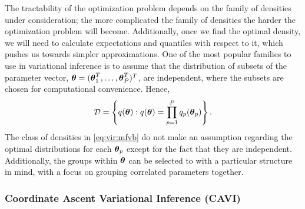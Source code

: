 \documentclass[]{article}
\newcommand{\V}[1]{{\bm{\mathbf{\MakeLowercase{#1}}}}} %
\def \vtheta{{\V{\theta}}}
\begin{document}
The tractability of the optimization problem depends on the family of densities
under consideration; the more complicated the family of densities the harder the
optimization problem will become. Additionally, once we find the optimal
density, we will need to calculate expectations and quantiles with respect to
it, which pushes us towards simpler approximations. One of the most popular
families to use in variational inference is to assume that the distribution of
subsets of the parameter vector, $\vtheta = (\vtheta^T_1, \dots,
\vtheta^T_P)^T$, are independent, where the subsets are chosen for computational
convenience. Hence, 
\begin{align}
\label{eq:vir:mfvb}
\mathcal{D} = \left\{q(\vtheta) : q(\vtheta) = \prod_{p = 1}^P 
q_p(\vtheta_p) \right\}. 
\end{align}
%
The class of densities in \eqref{eq:vir:mfvb} do not make an assumption
regarding the optimal distributions for each $\vtheta_p$ except for the fact
that they are independent. Additionally, the groups within $\vtheta$ can be
selected to with a particular structure in mind, with a focus on grouping
correlated parameters together. 

\subsubsection{Coordinate Ascent Variational Inference (CAVI)}
\end{document}
